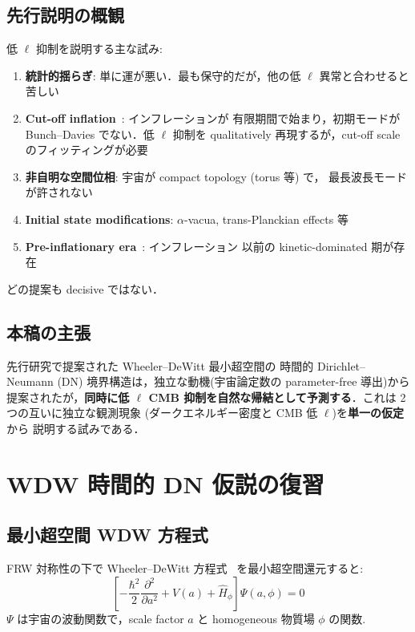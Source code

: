 \documentclass[11pt,a4paper]{article}
\begin{document}
\subsection{先行説明の概観}

低 $\ell$ 抑制を説明する主な試み:

\begin{enumerate}
\item \textbf{統計的揺らぎ}: 単に運が悪い．最も保守的だが，他の低 $\ell$
異常と合わせると苦しい
\item \textbf{Cut-off inflation}~\cite{Contaldi2003}: インフレーションが
有限期間で始まり，初期モードが Bunch--Davies でない．低 $\ell$ 抑制を
qualitatively 再現するが，cut-off scale のフィッティングが必要
\item \textbf{非自明な空間位相}: 宇宙が compact topology (torus 等) で，
最長波長モードが許されない~\cite{Luminet2003}
\item \textbf{Initial state modifications}: $\alpha$-vacua, trans-Planckian
effects 等~\cite{Danielsson2002}
\item \textbf{Pre-inflationary era}~\cite{Handley2016}: インフレーション
以前の kinetic-dominated 期が存在
\end{enumerate}

どの提案も decisive ではない．

\subsection{本稿の主張}

先行研究\cite{WDW-DN-paper}で提案された Wheeler--DeWitt 最小超空間の
時間的 Dirichlet--Neumann (DN) 境界構造は，独立な動機(宇宙論定数の
parameter-free 導出)から提案されたが，\textbf{同時に低 $\ell$ CMB
抑制を自然な帰結として予測する}．これは 2 つの互いに独立な観測現象
(ダークエネルギー密度と CMB 低 $\ell$)を\textbf{単一の仮定}から
説明する試みである．

\section{WDW 時間的 DN 仮説の復習}

\subsection{最小超空間 WDW 方程式}

FRW 対称性の下で Wheeler--DeWitt 方程式~\cite{DeWitt1967,Wheeler1968}
を最小超空間還元すると:
\begin{equation}
\left[-\frac{\hbar^2}{2}\frac{\partial^2}{\partial a^2} + V(a)
+ \hat{H}_\phi\right]\Psi(a,\phi) = 0
\end{equation}
$\Psi$ は宇宙の波動関数で，scale factor $a$ と homogeneous 物質場 $\phi$
の関数.
\end{document}
